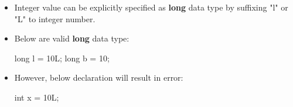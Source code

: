 
\begin{flushleft}


	\begin{itemize}
		
		\item Integer value can be explicitly specified as \textbf{long} data type by suffixing "l" or "L" to integer number.
		
		\item Below are valid \textbf{long} data type:
		\begin{tcolorbox}[breakable,notitle,boxrule=-0pt,colback=code,colframe=code]
			\color{black}
			\font=8pt
			long l = 10L; \newline
			long b = 10;
			\font=4pt
		\end{tcolorbox}	
		
		\item However, below declaration will result in error:
		\begin{tcolorbox}[breakable,notitle,boxrule=-0pt,colback=code,colframe=code]
			\color{black}
			\font=8pt
			int x = 10L;
			\font=4pt
		\end{tcolorbox}	
	\end{itemize}
	

\end{flushleft}

\newpage

